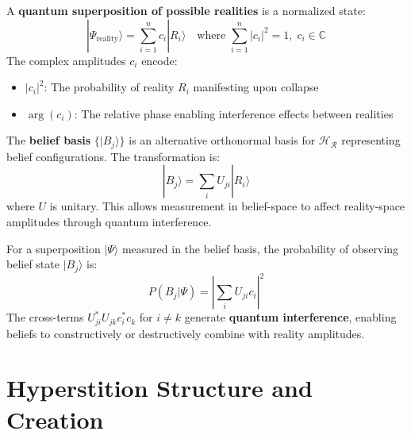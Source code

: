 \begin{definition}
\label{def:quantum-superposition-reality}
A \textbf{quantum superposition of possible realities} is a normalized state:
\begin{equation}
\boxed{
|\Psi_{\text{reality}}\rangle = \sum_{i=1}^{n} c_i |R_i\rangle \quad \text{where } \sum_{i=1}^{n} |c_i|^2 = 1, \; c_i \in \mathbb{C}
}
\end{equation}
The complex amplitudes $c_i$ encode:
\begin{itemize}
    \item $|c_i|^2$: The probability of reality $R_i$ manifesting upon collapse
    \item $\arg(c_i)$: The relative phase enabling interference effects between realities
\end{itemize}
\end{definition}

\begin{definition}
\label{def:belief-basis}
The \textbf{belief basis} $\{|B_j\rangle\}$ is an alternative orthonormal basis for $\mathcal{H}_{\mathcal{R}}$ representing belief configurations. The transformation is:
\[
|B_j\rangle = \sum_{i} U_{ji} |R_i\rangle
\]
where $U$ is unitary. This allows measurement in belief-space to affect reality-space amplitudes through quantum interference.
\end{definition}

\begin{proposition}
\label{prop:belief-reality-interference}
For a superposition $|\Psi\rangle$ measured in the belief basis, the probability of observing belief state $|B_j\rangle$ is:
\[
P(B_j | \Psi) = \left|\sum_i U_{ji} c_i\right|^2
\]
The cross-terms $U_{ji}^* U_{jk} c_i^* c_k$ for $i \neq k$ generate \textbf{quantum interference}, enabling beliefs to constructively or destructively combine with reality amplitudes.
\end{proposition}

\section{Hyperstition Structure and Creation}
\label{sec:hyperstition-creation}

